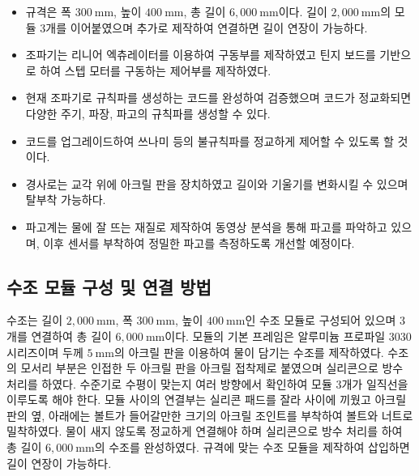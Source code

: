 \begin{itemize}
    \item 규격은 폭 $300~\mathrm{mm}$, 높이 $400~\mathrm{mm}$, 총 길이 $6,000~\mathrm{mm}$이다. 길이 $2,000~\mathrm{mm}$의 모듈 3개를 이어붙였으며 추가로 제작하여 연결하면 길이 연장이 가능하다.
    \item 조파기는 리니어 엑츄레이터를 이용하여 구동부를 제작하였고 틴지 보드를 기반으로 하여 스텝 모터를 구동하는 제어부를 제작하였다.
    \item 현재 조파기로 규칙파를 생성하는 코드를 완성하여 검증했으며 코드가 정교화되면 다양한 주기, 파장, 파고의 규칙파를 생성할 수 있다. 
    \item 코드를 업그레이드하여 쓰나미 등의 불규칙파를 정교하게 제어할 수 있도록 할 것이다.
    \item 경사로는 교각 위에 아크릴 판을 장치하였고 길이와 기울기를 변화시킬 수 있으며 탈부착 가능하다.
    \item 파고계는 물에 잘 뜨는 재질로 제작하여 동영상 분석을 통해 파고를 파악하고 있으며, 이후 센서를 부착하여 정밀한 파고를 측정하도록 개선할 예정이다.
\end{itemize}

\subsection{수조 모듈 구성 및 연결 방법}
수조는 길이 $2,000~\mathrm{mm}$, 폭 $300~\mathrm{mm}$, 높이 $400~\mathrm{mm}$인 수조 모듈로 구성되어 있으며 3개를 연결하여 총 길이 $6,000~\mathrm{mm}$이다. 모듈의 기본 프레임은 알루미늄 프로파일 3030 시리즈이며 두께 $5~\mathrm{mm}$의 아크릴 판을 이용하여 물이 담기는 수조를 제작하였다. 수조의 모서리 부분은 인접한 두 아크릴 판을 아크릴 접착제로 붙였으며 실리콘으로 방수 처리를 하였다. 수준기로 수평이 맞는지 여러 방향에서 확인하여 모듈 3개가 일직선을 이루도록 해야 한다. 모듈 사이의 연결부는 실리콘 패드를 잘라 사이에 끼웠고 아크릴 판의 옆, 아래에는 볼트가 들어갈만한 크기의 아크릴 조인트를 부착하여 볼트와 너트로 밀착하였다. 물이 새지 않도록 정교하게 연결해야 하며 실리콘으로 방수 처리를 하여 총 길이 $6,000~\mathrm{mm}$의 수조를 완성하였다. 규격에 맞는 수조 모듈을 제작하여 삽입하면 길이 연장이 가능하다.


